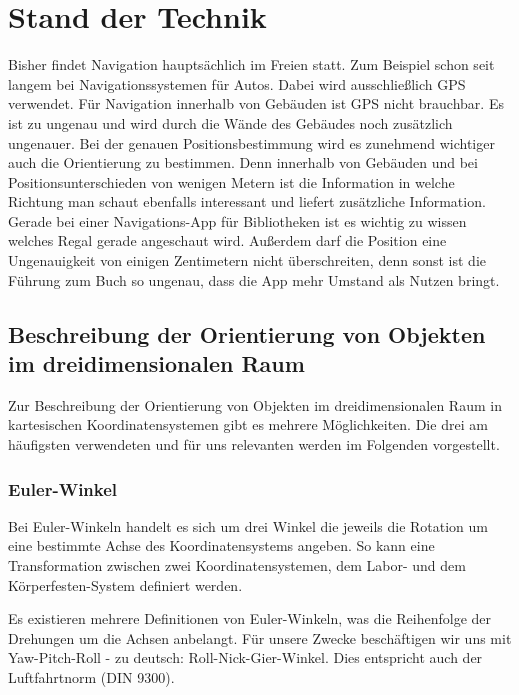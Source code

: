
\chapter{Stand der Technik}
  \label{Stand der Technik}

\medskip
Bisher findet Navigation hauptsächlich im Freien statt. Zum Beispiel schon seit langem bei Navigationssystemen für Autos. Dabei wird ausschließlich GPS verwendet. Für Navigation innerhalb von Gebäuden ist GPS nicht brauchbar. Es ist zu ungenau und wird durch die Wände des Gebäudes noch zusätzlich ungenauer. Bei der genauen Positionsbestimmung wird es zunehmend wichtiger auch die Orientierung zu bestimmen. Denn innerhalb von Gebäuden und bei Positionsunterschieden von wenigen Metern ist die Information in welche Richtung man schaut ebenfalls interessant und liefert zusätzliche Information. Gerade bei einer Navigations-App für Bibliotheken ist es wichtig zu wissen welches Regal gerade angeschaut wird. Außerdem darf die Position eine Ungenauigkeit von einigen Zentimetern nicht überschreiten, denn sonst ist die Führung zum Buch so ungenau, dass die App mehr Umstand als Nutzen bringt.

\section{Beschreibung der Orientierung von Objekten im dreidimensionalen Raum}
Zur Beschreibung der Orientierung von Objekten im dreidimensionalen Raum in kartesischen Koordinatensystemen gibt es mehrere Möglichkeiten. Die drei am häufigsten verwendeten und für uns relevanten werden im Folgenden vorgestellt.

\subsection{Euler-Winkel}
Bei Euler-Winkeln handelt es sich um drei Winkel die jeweils die Rotation um eine bestimmte Achse des Koordinatensystems angeben. So kann eine Transformation zwischen zwei Koordinatensystemen, dem Labor- und dem Körperfesten-System definiert werden.

Es existieren mehrere Definitionen von Euler-Winkeln, was die Reihenfolge der Drehungen um die Achsen anbelangt. Für unsere Zwecke beschäftigen wir uns mit Yaw-Pitch-Roll - zu deutsch: Roll-Nick-Gier-Winkel. Dies entspricht auch der Luftfahrtnorm (DIN 9300).

